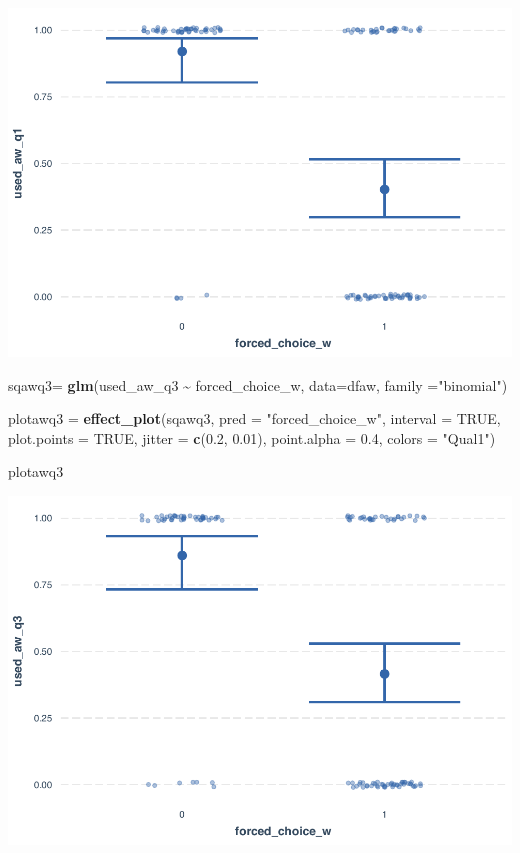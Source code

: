 \documentclass[
  11pt,
]{article}
\newenvironment{Shaded}{\begin{snugshade}}{\end{snugshade}}
\newcommand{\AttributeTok}[1]{\textcolor[rgb]{0.13,0.29,0.53}{#1}}
\newcommand{\ConstantTok}[1]{\textcolor[rgb]{0.56,0.35,0.01}{#1}}
\newcommand{\FloatTok}[1]{\textcolor[rgb]{0.00,0.00,0.81}{#1}}
\newcommand{\FunctionTok}[1]{\textcolor[rgb]{0.13,0.29,0.53}{\textbf{#1}}}
\newcommand{\NormalTok}[1]{#1}
\newcommand{\OtherTok}[1]{\textcolor[rgb]{0.56,0.35,0.01}{#1}}
\newcommand{\SpecialCharTok}[1]{\textcolor[rgb]{0.81,0.36,0.00}{\textbf{#1}}}
\newcommand{\StringTok}[1]{\textcolor[rgb]{0.31,0.60,0.02}{#1}}
\begin{document}
\includegraphics{analysis-July19_files/figure-latex/unnamed-chunk-37-1.pdf}

\begin{Shaded}
\begin{Highlighting}[]
\NormalTok{sqawq3}\OtherTok{=} \FunctionTok{glm}\NormalTok{(used\_aw\_q3 }\SpecialCharTok{\textasciitilde{}}\NormalTok{ forced\_choice\_w, }\AttributeTok{data=}\NormalTok{dfaw, }\AttributeTok{family =}\StringTok{"binomial"}\NormalTok{)}

\NormalTok{plotawq3 }\OtherTok{=} \FunctionTok{effect\_plot}\NormalTok{(sqawq3, }\AttributeTok{pred =} \StringTok{"forced\_choice\_w"}\NormalTok{, }\AttributeTok{interval =} \ConstantTok{TRUE}\NormalTok{, }\AttributeTok{plot.points =} \ConstantTok{TRUE}\NormalTok{, }\AttributeTok{jitter =} \FunctionTok{c}\NormalTok{(}\FloatTok{0.2}\NormalTok{, }\FloatTok{0.01}\NormalTok{), }\AttributeTok{point.alpha =} \FloatTok{0.4}\NormalTok{, }\AttributeTok{colors =} \StringTok{"Qual1"}\NormalTok{)}

\NormalTok{plotawq3}
\end{Highlighting}
\end{Shaded}

\includegraphics{analysis-July19_files/figure-latex/unnamed-chunk-38-1.pdf}
\end{document}
